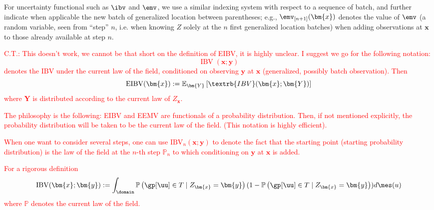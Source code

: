 For uncertainty functional such as $\ibv$ and $\emv$, we use a similar indexing system
with respect to a sequence of batch, and further indicate when applicable the new batch
of generalized location between parentheses; e.g., $\emv_{[n+1]}(\bm{x})$ denotes the value
of $\emv$ (a random variable, seen from ``step'' $n$, i.e. when knowing $Z$ solely at
the $n$ first generalized location batches) when adding observations at $\bm{x}$ to those
already available at step $n$.

\textcolor{red}{C.T.: This doesn't work, we cannot be that short on the definition of EIBV, it is highly unclear. I suggest we go for the following notation:
$$\operatorname{IBV}(\bm{x}; \bm{y})
$$ denotes the IBV under the current law of the field, conditioned on observing $\bm{y}$ at $\bm{x}$ (generalized, possibly batch observation). Then
$$
\operatorname{EIBV}(\bm{x}):=\mathbb{E}_{\bm{Y}}\left[\textrb{IBV}(\bm{x}; \bm{Y})\right]
$$
where $\bm{Y}$ is distributed according to the current law of $Z_{\bm{x}}$.}

\textcolor{red}{
The philosophy is the following: EIBV and EEMV are functionals of a probability distribution. Then, if not mentioned explicitly, the probability distribution will be taken to be the current law of the field. (This notation is highly efficient).}



\textcolor{red}{When one want to consider several steps, one can use $\textrm{IBV}_{n}(\bm{x}; \bm{y})$ to denote the fact that the starting point (starting probability distribution) is the law of the field at the $n$-th step $\mathbb{P}_n$ to which conditioning on $\bm{y}$ at $\bm{x}$ is added.}

\textcolor{red}{For a rigorous definition
$$
\operatorname{IBV}(\bm{x}; \bm{y}):=\int_{\domain}
\mathbb{P}\left(\gp[\uu]\in T\mid Z_{\bm{x}}=\bm{y}\right)(1-\mathbb{P}\left(\gp[\uu]\in T \mid Z_{\bm{x}}=\bm{y}\right))
d\mes(u) \\
$$
where $\mathbb{P}$ denotes the current law of the field.}



